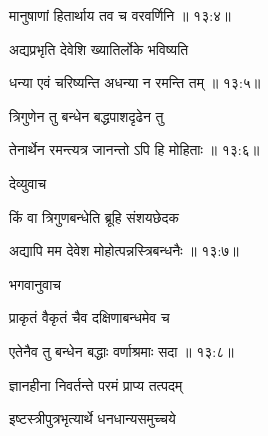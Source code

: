 
{\devanagarifont मानुषाणां हितार्थाय तव च वरवर्णिनि {॥ १३:४॥} \veg\dontdisplaylinenum }%
 
{\devanagarifont अद्यप्रभृति देवेशि ख्यातिर्लोके भविष्यति \thinspace{\dandab} \dontdisplaylinenum }%


{\devanagarifont धन्या एवं चरिष्यन्ति अधन्या न रमन्ति तम् {॥ १३:५॥} \veg\dontdisplaylinenum }%
 
{\devanagarifont त्रिगुणेन तु बन्धेन बद्धपाशदृढेन तु \thinspace{\dandab} \dontdisplaylinenum }%


{\devanagarifont तेनार्थेन रमन्त्यत्र जानन्तो ऽपि हि मोहिताः {॥ १३:६॥} \veg\dontdisplaylinenum }%


{\devanagarifont देव्युवाच {\dandab}\dontdisplaylinenum  }%
 
{\devanagarifont किं वा त्रिगुणबन्धेति ब्रूहि संशयछेदक \thinspace{\danda} \dontdisplaylinenum }%


{\devanagarifont अद्यापि मम देवेश मोहोत्पन्नस्त्रिबन्धनैः {॥ १३:७॥} \veg\dontdisplaylinenum }%
 
{\devanagarifont भगवानुवाच {\dandab}\dontdisplaylinenum  }%
 
{\devanagarifont प्राकृतं वैकृतं चैव दक्षिणाबन्धमेव च \thinspace{\danda} \dontdisplaylinenum }%


{\devanagarifont एतेनैव तु बन्धेन बद्धाः वर्णाश्रमाः सदा {॥ १३:८॥} \veg\dontdisplaylinenum }%
 
{\devanagarifont ज्ञानहीना निवर्तन्ते परमं प्राप्य तत्पदम् \thinspace{\dandab} \dontdisplaylinenum }%

{\devanagarifont इष्टस्त्रीपुत्रभृत्यार्थे धनधान्यसमुच्चये  \danda\dontdisplaylinenum }%

